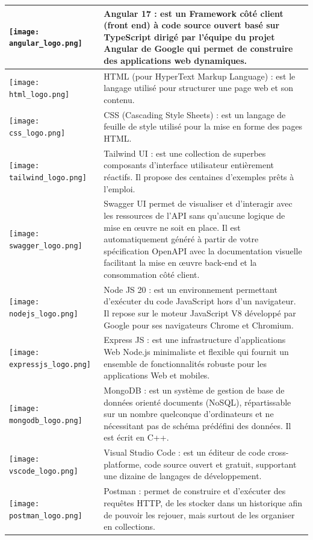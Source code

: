\begin{longtable}[c]{
        |p{}
        |p{}|
    }
        \texttt{[image: angular\_logo.png]} & Angular 17 : est un Framework côté client (front end) à code source ouvert basé sur TypeScript dirigé par l’équipe du projet Angular de Google qui permet de construire des applications web dynamiques. \\
        \hline
        \texttt{[image: html\_logo.png]} & HTML (pour HyperText Markup Language) : est le langage utilisé pour structurer une page web et son contenu. \\
        \hline
        \texttt{[image: css\_logo.png]} & CSS (Cascading Style Sheets) : est un langage de feuille de style utilisé pour la mise en forme des pages HTML. \\
        \hline
        \texttt{[image: tailwind\_logo.png]} & Tailwind UI : est une collection de superbes composants d'interface utilisateur entièrement réactifs. Il propose des centaines d'exemples prêts à l'emploi. \\
        \hline
        \texttt{[image: swagger\_logo.png]} & Swagger UI permet de visualiser et d'interagir avec les ressources de l'API sans qu'aucune logique de mise en œuvre ne soit en place. Il est automatiquement généré à partir de votre spécification OpenAPI avec la documentation visuelle facilitant la mise en œuvre back-end et la consommation côté client. \\
        \hline
        \texttt{[image: nodejs\_logo.png]} & Node JS 20 : est un environnement permettant d'exécuter du code JavaScript hors d'un navigateur. Il repose sur le moteur JavaScript V8 développé par Google pour ses navigateurs Chrome et Chromium. \\
        \hline
        \texttt{[image: expressjs\_logo.png]} & Express JS : est une infrastructure d'applications Web Node.js minimaliste et flexible qui fournit un ensemble de fonctionnalités robuste pour les applications Web et mobiles. \\
        \hline
        \texttt{[image: mongodb\_logo.png]} & MongoDB : est un système de gestion de base de données orienté documents (NoSQL), répartissable sur un nombre quelconque d'ordinateurs et ne nécessitant pas de schéma prédéfini des données. Il est écrit en C++. \\
        \hline
        \texttt{[image: vscode\_logo.png]} & Visual Studio Code : est un éditeur de code cross-platforme, code source ouvert et gratuit, supportant une dizaine de langages de développement. \\
        \hline
        \texttt{[image: postman\_logo.png]} & Postman : permet de construire et d’exécuter des requêtes HTTP, de les stocker dans un historique afin de pouvoir les rejouer, mais surtout de les organiser en collections. \\

\end{longtable}
